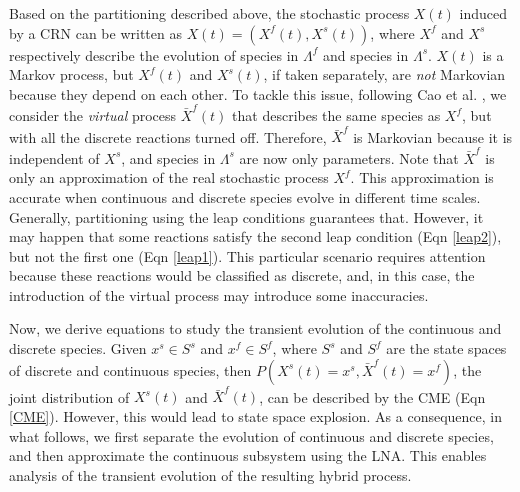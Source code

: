 \documentclass{llncs}
\begin{document}
Based on the partitioning described above, the stochastic process $X(t)$  induced by a CRN can be written as $X(t)=(X^f(t),X^s(t))$, where $X^f$ and $X^s$ respectively describe the evolution of species in $\Lambda^f$ and species in $\Lambda^s$. $X(t)$ is a Markov process, but $X^f(t)$  and $X^s(t)$, if taken separately, are \emph{not} Markovian because they depend on each other. 
To tackle this issue, following Cao et al. \cite{cao2005slow}, we consider the \emph{virtual} process $\bar{X}^f(t)$ that describes the same species as $X^f$, but with all the discrete reactions turned off. Therefore, $\bar{X}^f$ is Markovian because it is independent of $X^s$, and species in $\Lambda^s$ are now only parameters.
Note that $\bar{X}^f$ is only an approximation of the real stochastic process $X^f$. { This approximation is accurate when continuous and discrete species evolve in different time scales. Generally, partitioning using the leap conditions guarantees that. However, it may happen that some reactions satisfy the second leap condition (Eqn \ref{leap2}), but not the first one (Eqn \ref{leap1}). This particular scenario requires attention because these reactions would be classified as discrete, and, in this case, the introduction of the virtual process may introduce some inaccuracies.} 

Now, we derive equations to study the transient evolution of the continuous and discrete species.
Given $x^s \in S^s $ and  $x^f \in S^f $, where $S^s$ and $S^f$ are the state spaces of discrete and continuous species, then $P(X^s(t)=x^s,\bar{X}^f(t)=x^f)$, the joint distribution of $X^s(t)$ and $\bar{X}^f(t)$, can be described by the CME (Eqn \eqref{CME}). However, this would lead to state space explosion. As a consequence, in what follows, we first separate %
the evolution of continuous and discrete species, and then approximate the continuous subsystem using the LNA. This enables analysis of the transient evolution of the resulting hybrid process.
\end{document}
